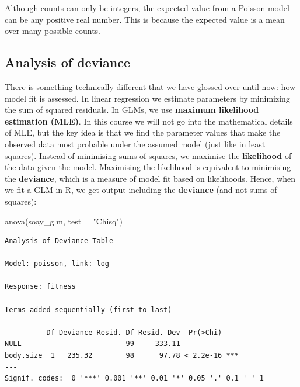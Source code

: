 \documentclass[
  letterpaper,
  8pt,
  a4paper]{book}
\newenvironment{Shaded}{\begin{snugshade}}{\end{snugshade}}
\newcommand{\AttributeTok}[1]{\textcolor[rgb]{0.40,0.45,0.13}{#1}}
\newcommand{\FunctionTok}[1]{\textcolor[rgb]{0.28,0.35,0.67}{#1}}
\newcommand{\NormalTok}[1]{\textcolor[rgb]{0.00,0.23,0.31}{#1}}
\newcommand{\StringTok}[1]{\textcolor[rgb]{0.13,0.47,0.30}{#1}}
\begin{document}
\begin{tcolorbox}[enhanced jigsaw, arc=.35mm, bottomrule=.15mm, bottomtitle=1mm, breakable, colback=white, colbacktitle=quarto-callout-note-color!10!white, colframe=quarto-callout-note-color-frame, coltitle=black, left=2mm, leftrule=.75mm, opacityback=0, opacitybacktitle=0.6, rightrule=.15mm, title=\textcolor{quarto-callout-note-color}{\faInfo}\hspace{0.5em}{Note}, titlerule=0mm, toprule=.15mm, toptitle=1mm]

Although counts can only be integers, the expected value from a Poisson
model can be any positive real number. This is because the expected
value is a mean over many possible counts.

\end{tcolorbox}

\subsection*{Analysis of deviance}\label{analysis-of-deviance}

There is something technically different that we have glossed over until
now: how model fit is assessed. In linear regression we estimate
parameters by minimizing the sum of squared residuals. In GLMs, we use
\textbf{maximum likelihood estimation (MLE)}. In this course we will not
go into the mathematical details of MLE, but the key idea is that we
find the parameter values that make the observed data most probable
under the assumed model (just like in least squares). Instead of
minimising sums of squares, we maximise the \textbf{likelihood} of the
data given the model. Maximising the likelihood is equivalent to
minimising the \textbf{deviance}, which is a measure of model fit based
on likelihoods. Hence, when we fit a GLM in R, we get output including
the \textbf{deviance} (and not sums of squares):

\begin{Shaded}
\begin{Highlighting}[]
\FunctionTok{anova}\NormalTok{(soay\_glm, }\AttributeTok{test =} \StringTok{"Chisq"}\NormalTok{)}
\end{Highlighting}
\end{Shaded}

\begin{verbatim}
Analysis of Deviance Table

Model: poisson, link: log

Response: fitness

Terms added sequentially (first to last)

          Df Deviance Resid. Df Resid. Dev  Pr(>Chi)    
NULL                         99     333.11              
body.size  1   235.32        98      97.78 < 2.2e-16 ***
---
Signif. codes:  0 '***' 0.001 '**' 0.01 '*' 0.05 '.' 0.1 ' ' 1
\end{verbatim}
\end{document}
